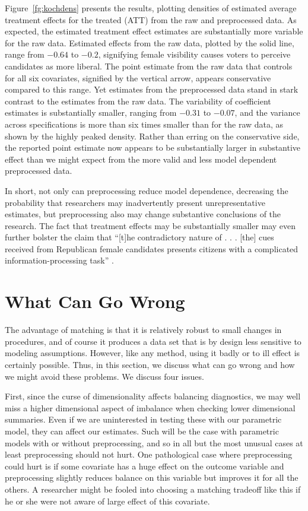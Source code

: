 \documentclass[11pt,titlepage]{article}
\begin{document}
Figure~\ref{fg:kochdens} presents the results, plotting densities of
estimated average treatment effects for the treated (ATT) from the raw
and preprocessed data.  As expected, the estimated treatment effect
estimates are substantially more variable for the raw data.  Estimated
effects from the raw data, plotted by the solid line, range from
$-0.64$ to $-0.2$, signifying female visibility causes voters to
perceive candidates as more liberal.  The point estimate from the raw
data that controls for all six covariates, signified by the vertical
arrow, appears conservative compared to this range.  Yet estimates
from the preprocessed data stand in stark contrast to the estimates
from the raw data.  The variability of coefficient estimates is
substantially smaller, ranging from $-0.31$ to $-0.07$, and the
variance across specifications is more than six times smaller than for
the raw data, as shown by the highly peaked density.  Rather than
erring on the conservative side, the reported point estimate now
appears to be substantially larger in substantive effect than we might
expect from the more valid and less model dependent preprocessed data.

In short, not only can preprocessing reduce model dependence,
decreasing the probability that researchers may inadvertently present
unrepresentative estimates, but preprocessing also may change
substantive conclusions of the research.  The fact that treatment
effects may be substantially smaller may even further bolster the
claim that ``[t]he contradictory nature of . . . [the] cues received
from Republican female candidates presents citizens with a complicated
information-processing task'' \citep[p. 460]{Koch02}.

\section{What Can Go Wrong}

The advantage of matching is that it is relatively robust to small
changes in procedures, and of course it produces a data set that is by
design less sensitive to modeling assumptions.  However, like any
method, using it badly or to ill effect is certainly possible.  Thus,
in this section, we discuss what can go wrong and how we might avoid
these problems.  We discuss four issues.

First, since the curse of dimensionality affects balancing
diagnostics, we may well miss a higher dimensional aspect of imbalance
when checking lower dimensional summaries.  Even if we are
uninterested in testing these with our parametric model, they can
affect our estimates.  Such will be the case with parametric models
with or without preprocessing, and so in all but the most unusual
cases at least preprocessing should not hurt.  One pathological case
where preprocessing could hurt is if some covariate has a huge effect
on the outcome variable and preprocessing slightly reduces balance on
this variable but improves it for all the others.  A researcher might
be fooled into choosing a matching tradeoff like this if he or she
were not aware of large effect of this covariate.
\end{document}
